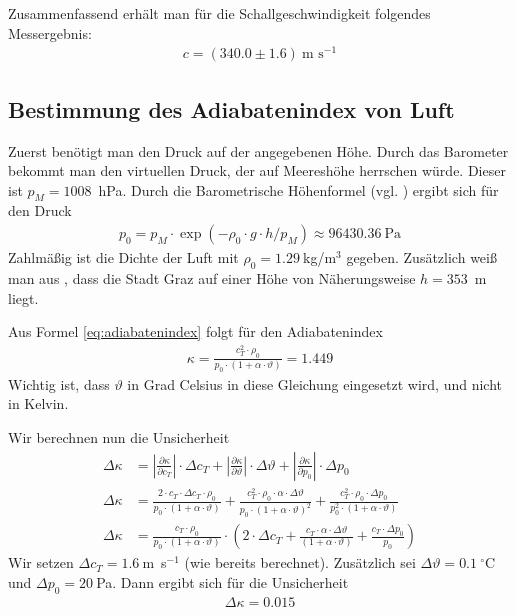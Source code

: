 \documentclass{article}
\begin{document}
Zusammenfassend erhält man für die Schallgeschwindigkeit folgendes Messergebnis:
\begin{align*}
c = (340.0 \pm 1.6)~\text{m s}^{-1}
\end{align*}

\subsection{Bestimmung des Adiabatenindex von Luft}

Zuerst benötigt man den Druck auf der angegebenen Höhe. Durch das Barometer bekommt man den virtuellen Druck, der auf Meereshöhe herrschen würde. Dieser ist $p_M = 1008$~hPa. Durch die Barometrische Höhenformel (vgl. \cite{demtr1}) ergibt sich für den Druck
\begin{align}
p_0 = p_M\cdot \exp(-\rho_0 \cdot g \cdot h / p_M) \approx 96430.36~\text{Pa}
\end{align}
Zahlmäßig ist die Dichte der Luft mit $\rho_0 = 1.29~$kg/m${}^3$ gegeben. Zusätzlich weiß man aus \cite{graz}, dass die Stadt Graz auf einer Höhe von Näherungsweise $h=353$~m liegt.

Aus Formel \eqref{eq:adiabatenindex} folgt für den Adiabatenindex
\begin{align}
\kappa = \frac{c_T^2\cdot \rho_0}{p_0\cdot (1 + \alpha\cdot \vartheta)} = 1.449
\end{align}
Wichtig ist, dass $\vartheta$ in Grad Celsius in diese Gleichung eingesetzt wird, und nicht in Kelvin.

Wir berechnen nun die Unsicherheit
\begin{align}
\Delta\kappa &= \left| \frac{\partial\kappa}{\partial c_T} \right| \cdot \Delta c_T + \left| \frac{\partial\kappa}{\partial \vartheta} \right| \cdot \Delta \vartheta + \left| \frac{\partial\kappa}{\partial p_0} \right| \cdot \Delta p_0 \\
\Delta\kappa &= \frac{2\cdot c_T  \cdot \Delta c_T \cdot \rho_0}{p_0\cdot (1 + \alpha\cdot \vartheta)} + \frac{c_T^2\cdot \rho_0\cdot \alpha \cdot \Delta \vartheta}{p_0\cdot (1 + \alpha\cdot \vartheta)^2} + \frac{c_T^2\cdot \rho_0 \cdot \Delta p_0}{p_0^2\cdot (1 + \alpha\cdot \vartheta)} \\
\Delta \kappa &= \frac{c_T\cdot \rho_0}{p_0\cdot (1+\alpha\cdot \vartheta)}\cdot \left(2\cdot \Delta c_T +  \frac{c_T\cdot \alpha\cdot\Delta\vartheta}{(1+\alpha\cdot \vartheta)} + \frac{c_T\cdot \Delta p_0}{p_0}\right)
\end{align}
Wir setzen $\Delta c_T = 1.6~$m~s${}^{-1}$ (wie bereits berechnet). Zusätzlich sei $\Delta\vartheta = 0.1~^\circ$C und $\Delta p_0 = 20~$Pa. Dann ergibt sich für die Unsicherheit
\begin{align*}
\Delta \kappa = 0.015
\end{align*}
\end{document}
